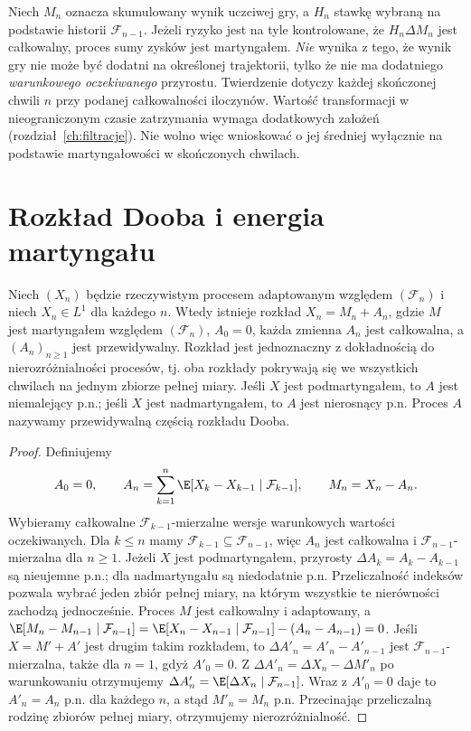 \begin{przyklad}
Niech $M_n$ oznacza skumulowany wynik uczciwej gry,
a $H_n$ stawkę wybraną na podstawie historii
$\mathcal F_{n-1}$. Jeżeli ryzyko jest na tyle
kontrolowane, że $H_n\Delta M_n$ jest całkowalny,
proces sumy zysków jest martyngałem.
\emph{Nie} wynika z tego, że wynik gry nie może
być dodatni na określonej trajektorii, tylko że
nie ma dodatniego \emph{warunkowego oczekiwanego}
przyrostu. Twierdzenie dotyczy każdej skończonej chwili $n$
przy podanej całkowalności iloczynów.
Wartość transformacji w nieograniczonym czasie
zatrzymania wymaga dodatkowych założeń
(rozdział~\ref{ch:filtracje}). Nie wolno więc
wnioskować o jej średniej wyłącznie na podstawie
martyngałowości w skończonych chwilach.
\end{przyklad}

\section{Rozkład Dooba i energia martyngału}

\begin{twierdzenie}
Niech $(X_n)$ będzie rzeczywistym procesem
adaptowanym względem $(\mathcal F_n)$ i niech
$X_n\in L^1$ dla każdego $n$.
Wtedy istnieje rozkład $X_n=M_n+A_n$,
gdzie $M$ jest martyngałem względem $(\mathcal F_n)$,
$A_0=0$, każda zmienna $A_n$ jest całkowalna,
a $(A_n)_{n\geq1}$ jest przewidywalny.
Rozkład jest jednoznaczny z dokładnością
do nierozróżnialności procesów, tj. oba rozkłady
pokrywają się we wszystkich chwilach na jednym
zbiorze pełnej miary.
Jeśli $X$ jest podmartyngałem, to $A$ jest
niemalejący p.n.; jeśli $X$ jest nadmartyngałem,
to $A$ jest nierosnący p.n.
Proces $A$ nazywamy przewidywalną częścią
rozkładu Dooba.
\end{twierdzenie}
\begin{proof}
Definiujemy
\[
A_0=0,\qquad
A_n=\sum_{k=1}^n\E[X_k-X_{k-1}\mid\mathcal F_{k-1}],
\qquad M_n=X_n-A_n.
\]
Wybieramy całkowalne $\mathcal F_{k-1}$-mierzalne
wersje warunkowych wartości oczekiwanych.
Dla $k\leq n$ mamy $\mathcal F_{k-1}\subseteq
\mathcal F_{n-1}$, więc $A_n$ jest całkowalna
i $\mathcal F_{n-1}$-mierzalna dla $n\geq1$.
Jeżeli $X$ jest podmartyngałem, przyrosty
$\Delta A_k=A_k-A_{k-1}$ są nieujemne p.n.;
dla nadmartyngału są niedodatnie p.n.
Przeliczalność indeksów pozwala wybrać jeden
zbiór pełnej miary, na którym wszystkie te
nierówności zachodzą jednocześnie.
Proces $M$ jest całkowalny i adaptowany, a
$\E[M_n-M_{n-1}\mid\mathcal F_{n-1}]
=\E[X_n-X_{n-1}\mid\mathcal F_{n-1}]
-(A_n-A_{n-1})=0$.
Jeśli $X=M'+A'$ jest drugim takim rozkładem,
to $\Delta A'_n=A'_n-A'_{n-1}$ jest
$\mathcal F_{n-1}$-mierzalna, także dla $n=1$,
gdyż $A'_0=0$.
Z $\Delta A'_n=\Delta X_n-\Delta M'_n$
po warunkowaniu otrzymujemy
$\Delta A'_n=\E[\Delta X_n\mid\mathcal F_{n-1}]$.
Wraz z $A'_0=0$ daje to $A'_n=A_n$ p.n.
dla każdego $n$, a stąd $M'_n=M_n$ p.n.
Przecinając przeliczalną rodzinę zbiorów
pełnej miary, otrzymujemy nierozróżnialność.
\end{proof}

